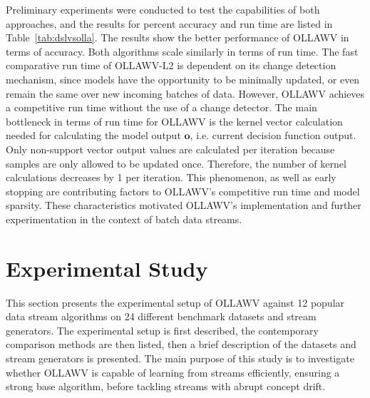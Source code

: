 \documentclass[reqno]{vcuthesis}
\numberwithin{equation}{chapter}
\begin{document}
Preliminary experiments were conducted to test the capabilities of both approaches, and the results for percent accuracy and run time are listed in Table~\ref{tab:dslvsolla}. The results show the better performance of OLLAWV in terms of accuracy. Both algorithms scale similarly in terms of run time. The fast comparative run time of OLLAWV-L2 is dependent on its change detection mechanism, since models have the opportunity to be minimally updated, or even remain the same over new incoming batches of data. However, OLLAWV achieves a competitive run time without the use of a change detector. The main bottleneck in terms of run time for OLLAWV is the kernel vector calculation needed for calculating the model output $\bm o$, i.e. current decision function output. Only non-support vector output values are calculated per iteration because samples are only allowed to be updated once. Therefore, the number of kernel calculations decreases by 1 per iteration. This phenomenon, as well as early stopping are contributing factors to OLLAWV's competitive run time and model sparsity. These characteristics motivated OLLAWV's implementation and further experimentation in the context of batch data streams.

\section{Experimental Study}
This section presents the experimental setup of OLLAWV against 12 popular data stream algorithms on 24 different benchmark datasets and stream generators. The experimental setup is first described, the contemporary comparison methods are then listed, then a brief description of the datasets and stream generators is presented. The main purpose of this study is to investigate whether OLLAWV is capable of learning from streams efficiently, ensuring a strong base algorithm, before tackling streams with abrupt concept drift. 
\end{document}
